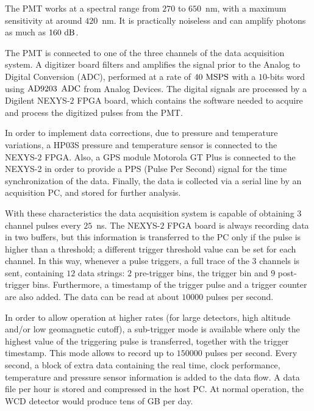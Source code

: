 \documentclass[12pt]{article}
\begin{document}
The PMT works at a spectral range from $270$ to $650$~nm, with a maximum sensitivity at around $420$~nm. It is practically noiseless and can amplify photons as much as ${160\ {\rm dB}}$.

The PMT is connected to one of the three channels of the data acquisition system. A digitizer board filters and amplifies 
the signal prior to the Analog to Digital Conversion (ADC), performed at a rate of ${40\ {\rm MSPS}}$ with a $10$-bits word using ${{\rm AD}9203}$ ${\rm ADC}$ from Analog Devices. The digital signals are processed by a Digilent NEXYS-$2$ FPGA board, which contains the software needed to acquire and process the digitized pulses from the PMT. 

In order to implement data corrections, due to pressure and temperature variations, a HP$03$S pressure and temperature sensor is connected to the NEXYS-$2$ FPGA. Also, a GPS module Motorola GT Plus is connected to the NEXYS-2 in order to provide a PPS (Pulse Per Second) signal for the time synchronization of the data. Finally, the data is collected via a serial line by an acquisition PC, and stored for further analysis.

With these characteristics the data acquisition system is capable of obtaining 3 channel pulses every $25$~ns. The NEXYS-$2$ FPGA board is always recording data in two buffers, but this information is transferred to the PC only if the pulse is higher than a threshold; a different trigger threshold value can be set for each channel. In this way, whenever a pulse triggers, a full trace of the $3$ channels is sent, containing $12$ data strings: $2$ pre-trigger bins, the trigger bin and $9$ post-trigger bins. Furthermore, a time\-stamp of the trigger pulse and a trigger counter are also added. The data can be read at about $10000$ pulses per second.

In order to allow operation at higher rates (for large detectors, high altitude and/or low geomagnetic cutoff), a sub-trigger mode is available where only the highest value of the triggering pulse is transferred, together with the trigger timestamp. This mode allows to record up to $150000$ pulses per second. Every second, a block of extra data containing the real time, clock performance, temperature and pressure sensor information is added to the data flow. A data file per hour is stored and compressed in the host PC. At normal operation, the WCD detector would produce tens of GB per day.
\end{document}
